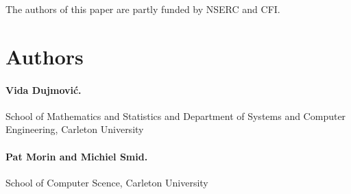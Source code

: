 \documentclass{patmorin}
\begin{document}
The authors of this paper are partly funded by NSERC and CFI.

\section*{Authors}

\paragraph{Vida Dujmovi\'c.}
School of Mathematics and Statistics and Department of Systems and Computer Engineering, Carleton University

\paragraph{Pat Morin and Michiel Smid.}
School of Computer Scence, Carleton University




\end{document}
